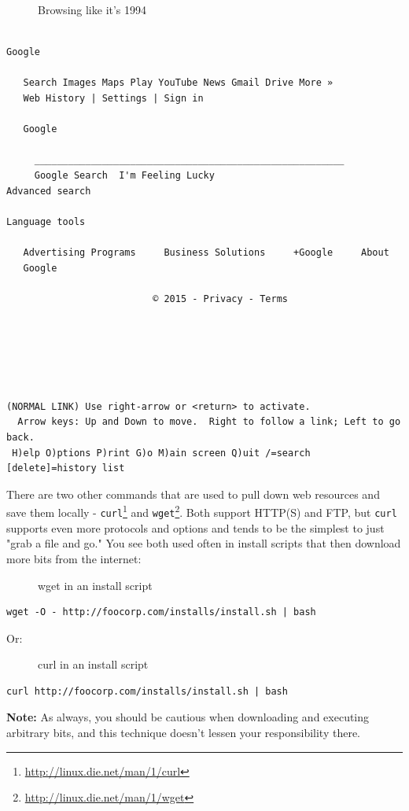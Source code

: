 \documentclass[10pt,]{book}
\renewcommand{\href}[2]{#2\footnote{\url{#1}}}
\numberwithin{figure}{chapter}
\DeclareRobustCommand{\drcap}[1]{\begin{figure}[H]\caption{#1}\end{figure}}
\DeclareRobustCommand{\drcmd}[1]{\index{Commands!#1}}
\begin{document}
\drcap{Browsing like it's 1994}

\begin{verbatim}
                                                                          Google

   Search Images Maps Play YouTube News Gmail Drive More »
   Web History | Settings | Sign in

   Google

     _______________________________________________________
     Google Search  I'm Feeling Lucky                          Advanced search
                                                               Language tools

   Advertising Programs     Business Solutions     +Google     About
   Google

                          © 2015 - Privacy - Terms






(NORMAL LINK) Use right-arrow or <return> to activate.
  Arrow keys: Up and Down to move.  Right to follow a link; Left to go back.
 H)elp O)ptions P)rint G)o M)ain screen Q)uit /=search [delete]=history list 
\end{verbatim}

There are two other commands that are used to pull down web resources
and save them locally -
\href{http://linux.die.net/man/1/curl}{\texttt{curl}}\drcmd{curl} and
\href{http://linux.die.net/man/1/wget}{\texttt{wget}}\drcmd{wget}. Both
support HTTP(S) and FTP, but \texttt{curl} supports even more protocols
and options and tends to be the simplest to just "grab a file and go."
You see both used often in install scripts that then download more bits
from the internet:

\drcap{wget in an install script}

\begin{verbatim}
wget -O - http://foocorp.com/installs/install.sh | bash
\end{verbatim}

Or:

\drcap{curl in an install script}

\begin{verbatim}
curl http://foocorp.com/installs/install.sh | bash
\end{verbatim}

\textbf{Note:} As always, you should be cautious when downloading and
executing arbitrary bits, and this technique doesn't lessen your
responsibility there.
\end{document}
